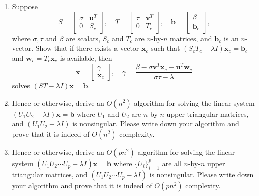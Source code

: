 \begin{exercise}
\label{applied:2010:5}
\begin{enumerate}
    \item Suppose
    \[
    S = \begin{bmatrix} \sigma & \mathbf{u}^T \\ 0 & S_c \end{bmatrix}, \quad T = \begin{bmatrix} \tau & \mathbf{v}^T \\ 0 & T_c \end{bmatrix}, \quad \mathbf{b} = \begin{bmatrix} \beta \\ \mathbf{b}_c \end{bmatrix},
    \]
    where $\sigma, \tau$ and $\beta$ are scalars, $S_c$ and $T_c$ are $n$-by-$n$ matrices, and $\mathbf{b}_c$ is an $n$-vector. Show that if there exists a vector $\mathbf{x}_c$ such that $(S_c T_c - \lambda I) \mathbf{x}_c = \mathbf{b}_c$ and $\mathbf{w}_c = T_c \mathbf{x}_c$ is available, then
    \[
    \mathbf{x} = \begin{bmatrix} \gamma \\ \mathbf{x}_c \end{bmatrix}, \quad \gamma = \frac{\beta - \sigma \mathbf{v}^T \mathbf{x}_c - \mathbf{u}^T \mathbf{w}_c}{\sigma \tau - \lambda}
    \]
    solves $(ST - \lambda I) \mathbf{x} = \mathbf{b}$.

    \item Hence or otherwise, derive an $O(n^2)$ algorithm for solving the linear system $(U_1 U_2 - \lambda I) \mathbf{x} = \mathbf{b}$ where $U_1$ and $U_2$ are $n$-by-$n$ upper triangular matrices, and $(U_1 U_2 - \lambda I)$ is nonsingular. Please write down your algorithm and prove that it is indeed of $O(n^2)$ complexity.

    \item Hence or otherwise, derive an $O(pn^2)$ algorithm for solving the linear system $(U_1 U_2 \cdots U_p - \lambda I) \mathbf{x} = \mathbf{b}$ where $\{U_i\}_{i=1}^p$ are all $n$-by-$n$ upper triangular matrices, and $(U_1 U_2 \cdots U_p - \lambda I)$ is nonsingular. Please write down your algorithm and prove that it is indeed of $O(pn^2)$ complexity.
\end{enumerate}
\end{exercise}

